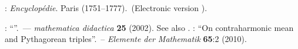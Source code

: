 \documentclass[12pt]{article}
\theoremstyle{definition}
\begin{document}
\begin{thebibliography}{8}
: {\em Encyclop\'edie}. Paris (1751--1777).\, (Electronic version ).

: ``''.\, --- {\em mathematica didactica} \textbf{25} (2002). See also .
: ``On contraharmonic mean and Pythagorean triples''.\, -- \emph{Elemente der Mathematik} \textbf{65}:2 (2010).

\end{thebibliography}

\end{document}
